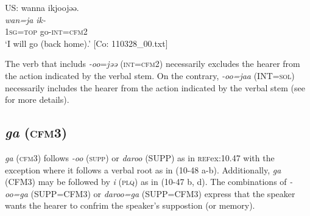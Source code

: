   \ex  US: 
      \glll wanna  ikjoojəə.\\
      \textit{wan=ja}  \textit{ik-}\\
      1\textsc{sg}=\textsc{top}  go-\textsc{int}=\textsc{cfm}2\\
      \glt       ‘I will go (back home).’ [Co: 110328\_00.txt]
    \z
\z

The verb that includs \textit{{}-oo}=\textit{jəə} (\textsc{int}=\textsc{cfm}2) necessarily excludes the hearer from the action indicated by the verbal stem. On the contrary, \textit{{}-oo=jaa} (INT=\textsc{sol}) necessarily includes the hearer from the action indicated by the verbal stem (see  for more details).

\subsection{\textit{ga} (\textsc{cfm}3)}\label{sec:10.3.5}

\textit{ga} (\textsc{cfm}3) follows \textit{{}-oo} (\textsc{supp}) or \textit{daroo} (SUPP) as in \textsc{ref}{ex:10.47} with the exception where it follows a verbal root as in (10-48 a-b). Additionally, \textit{ga} (CFM3) may be followed by \textit{i} (\textsc{plq}) as in (10-47 b, d). The combinations of \textit{{}-oo=ga} (SUPP=CFM3) or \textit{daroo=ga} (SUPP=CFM3) express that the speaker wants the hearer to confrim the speaker’s suppostion (or memory).

